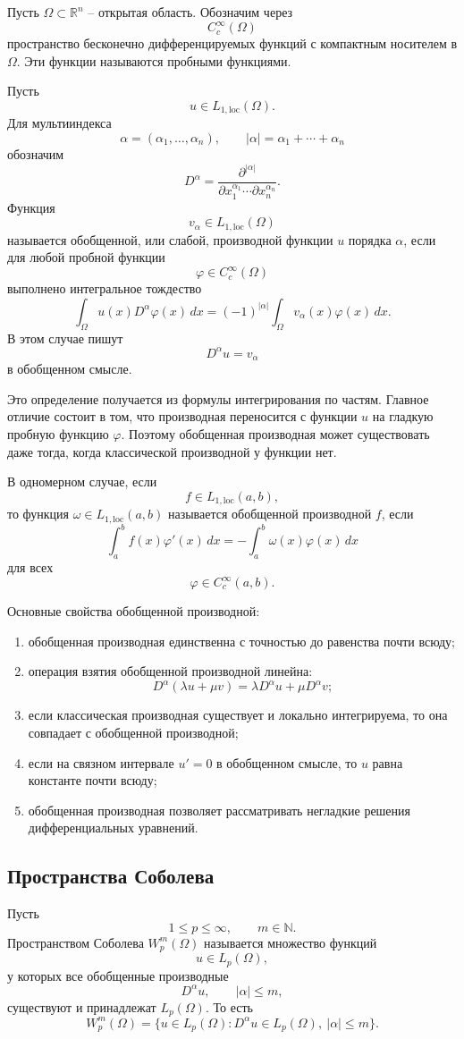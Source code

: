 \documentclass[12pt,a4paper]{article}
\newcommand{\R}{\mathbb{R}}
\begin{document}
Пусть \(\Omega\subset\R^n\) -- открытая область. Обозначим через
\[
C_c^\infty(\Omega)
\]
пространство бесконечно дифференцируемых функций с компактным носителем в \(\Omega\). Эти функции называются пробными функциями.

Пусть
\[
u\in L_{1,\mathrm{loc}}(\Omega).
\]
Для мультииндекса
\[
\alpha=(\alpha_1,\ldots,\alpha_n),\qquad
|\alpha|=\alpha_1+\cdots+\alpha_n
\]
обозначим
\[
D^\alpha=
\frac{\partial^{|\alpha|}}{\partial x_1^{\alpha_1}\cdots \partial x_n^{\alpha_n}}.
\]
Функция
\[
v_\alpha\in L_{1,\mathrm{loc}}(\Omega)
\]
называется обобщенной, или слабой, производной функции \(u\) порядка \(\alpha\), если для любой пробной функции
\[
\varphi\in C_c^\infty(\Omega)
\]
выполнено интегральное тождество
\[
\int_\Omega u(x)D^\alpha\varphi(x)\,dx
=
(-1)^{|\alpha|}
\int_\Omega v_\alpha(x)\varphi(x)\,dx.
\]
В этом случае пишут
\[
D^\alpha u=v_\alpha
\]
в обобщенном смысле.

Это определение получается из формулы интегрирования по частям. Главное отличие состоит в том, что производная переносится с функции \(u\) на гладкую пробную функцию \(\varphi\). Поэтому обобщенная производная может существовать даже тогда, когда классической производной у функции нет.

В одномерном случае, если
\[
f\in L_{1,\mathrm{loc}}(a,b),
\]
то функция \(\omega\in L_{1,\mathrm{loc}}(a,b)\) называется обобщенной производной \(f\), если
\[
\int_a^b f(x)\varphi'(x)\,dx
=
-
\int_a^b \omega(x)\varphi(x)\,dx
\]
для всех
\[
\varphi\in C_c^\infty(a,b).
\]

Основные свойства обобщенной производной:
\begin{enumerate}[leftmargin=2em]
\item обобщенная производная единственна с точностью до равенства почти всюду;
\item операция взятия обобщенной производной линейна:
\[
D^\alpha(\lambda u+
\mu v)=\lambda D^\alpha u+\mu D^\alpha v;
\]
\item если классическая производная существует и локально интегрируема, то она совпадает с обобщенной производной;
\item если на связном интервале \(u'=0\) в обобщенном смысле, то \(u\) равна константе почти всюду;
\item обобщенная производная позволяет рассматривать негладкие решения дифференциальных уравнений.
\end{enumerate}

\subsection*{Пространства Соболева}
Пусть
\[
1\le p\le\infty,
\qquad
m\in\mathbb N.
\]
Пространством Соболева \(W_p^m(\Omega)\) называется множество функций
\[
u\in L_p(\Omega),
\]
у которых все обобщенные производные
\[
D^\alpha u,
\qquad |\alpha|\le m,
\]
существуют и принадлежат \(L_p(\Omega)\). То есть
\[
W_p^m(\Omega)=
\{u\in L_p(\Omega):D^\alpha u\in L_p(\Omega),\ |\alpha|\le m\}.
\]
\end{document}
